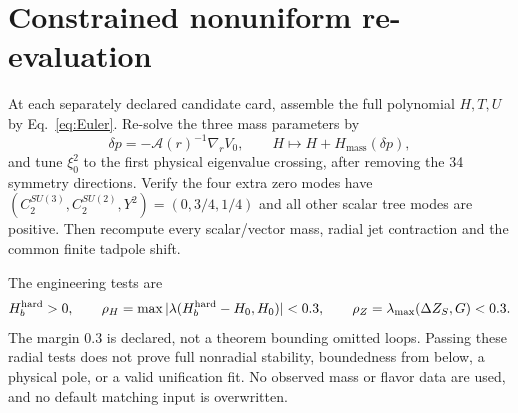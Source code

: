 \documentclass[11pt]{article}
\begin{document}
\section{Constrained nonuniform re-evaluation}
At each separately declared candidate card, assemble the full polynomial
$H,T,U$ by Eq.~\eqref{eq:Euler}. Re-solve the three mass parameters by
\begin{equation}
 \delta p=-\mathcal A(r)^{-1}\nabla_r V_0,
 \qquad H\mapsto H+H_{\mathrm{mass}}(\delta p),
\end{equation}
and tune $\xi_0^2$ to the first physical eigenvalue crossing, after
removing the 34 symmetry directions. Verify the four extra zero modes
have $(C_2^{SU(3)},C_2^{SU(2)},Y^2)=(0,3/4,1/4)$ and all other scalar
tree modes are positive. Then recompute every scalar/vector mass,
radial jet contraction and the common finite tadpole shift.

The engineering tests are
\begin{equation}
 H_b^{\rm hard}>0,\qquad
 \rho_H=\max|\lambda(H_b^{\rm hard}-H_0,H_0)|<0.3,
 \qquad \rho_Z=\lambda_{\max}(\Delta Z_S,G)<0.3.
\end{equation}
The margin $0.3$ is declared, not a theorem bounding omitted loops.
Passing these radial tests does not prove full nonradial stability,
boundedness from below, a physical pole, or a valid unification fit.
No observed mass or flavor data are used, and no default matching input
is overwritten.
\end{document}
